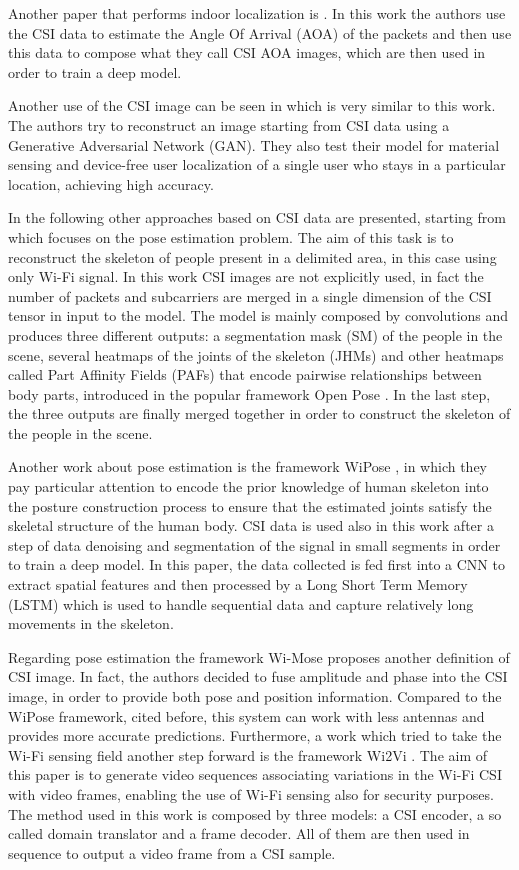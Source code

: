 \documentclass[binding=0.6cm,noexaminfo]{sapthesis}
\begin{document}
Another paper that performs indoor localization is \cite{cifi}. In this work the authors use the CSI data to estimate the Angle Of Arrival (AOA) of the packets and then use this data to compose what they call CSI AOA images, which are then used in order to train a deep model.

Another use of the CSI image can be seen in \cite{csi2image} which is very similar to this work. The authors try to reconstruct an image starting from CSI data using a Generative Adversarial Network (GAN). They also test their model for material sensing and device-free user localization of a single user who stays in a particular location, achieving high accuracy.

In the following other approaches based on CSI data are presented, starting from \cite{person-in-wifi} which focuses on the pose estimation problem. The aim of this task is to reconstruct the skeleton of people present in a delimited area, in this case using only Wi-Fi signal. In this work CSI images are not explicitly used, in fact the number of packets and subcarriers are merged in a single dimension of the CSI tensor in input to the model. The model is mainly composed by convolutions and produces three different outputs: a segmentation mask (SM) of the people in the scene, several heatmaps of the joints of the skeleton (JHMs) and other heatmaps called Part Affinity Fields (PAFs) that encode pairwise relationships between body parts, introduced in the popular framework Open Pose \cite{open-pose}. In the last step, the three outputs are finally merged together in order to construct the skeleton of the people in the scene.

Another work about pose estimation is the framework WiPose \cite{towards-human-pose-construction}, in which they pay particular attention to encode the prior knowledge of human skeleton into the posture construction process to ensure that the estimated joints satisfy the skeletal structure of the human body. CSI data is used also in this work after a step of data denoising and segmentation of the signal in small segments in order to train a deep model. In this paper, the data collected is fed first into a CNN to extract spatial features and then processed by a Long Short Term Memory (LSTM) which is used to handle sequential data and capture relatively long movements in the skeleton.

Regarding pose estimation the framework Wi-Mose \cite{wimose} proposes another definition of CSI image. In fact, the authors decided to fuse amplitude and phase into the CSI image, in order to provide both pose and position information. Compared to the WiPose framework, cited before, this system can work with less antennas and provides more accurate predictions.
Furthermore, a work which tried to take the Wi-Fi sensing field another step forward is the framework Wi2Vi \cite{wi2vi}. The aim of this paper is to generate video sequences associating variations in the Wi-Fi CSI with video frames, enabling the use of Wi-Fi sensing also for security purposes. The method used in this work is composed by three models: a CSI encoder, a so called domain translator and a frame decoder. All of them are then used in sequence to output a video frame from a CSI sample.
\end{document}
